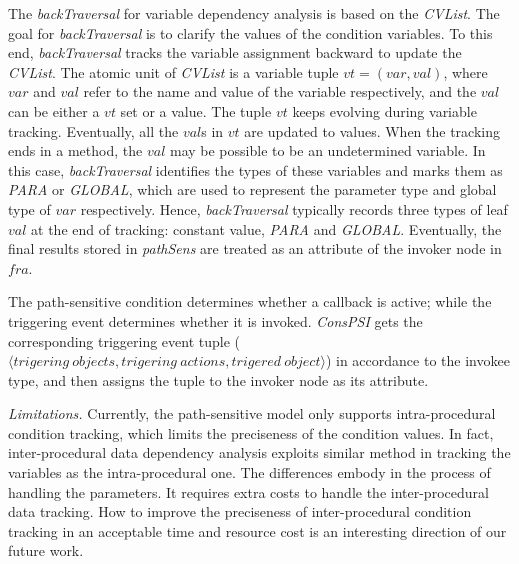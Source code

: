 The \textit{backTraversal} for variable dependency analysis is based on the \textit{CVList}. The goal for \textit{backTraversal} is to clarify the values of the condition variables. To this end, \textit{backTraversal} tracks the variable assignment backward to update the \textit{CVList}. The atomic unit of \textit{CVList} is a variable tuple $\mathit{vt} = (\mathit{var}, \mathit{val})$, where $\mathit{var}$ and $\mathit{val}$ refer to the name and value of the variable respectively, and the $\mathit{val}$ can be either a $\mathit{vt}$ set or a value. The tuple $\mathit{vt}$ keeps evolving during variable tracking. Eventually, all the $\mathit{val}$s in $\mathit{vt}$ are updated to values. %
When the tracking ends in a method, the $\mathit{val}$ may be possible to be an undetermined variable.
In this case, \textit{backTraversal} identifies the types of these variables and marks them as \textit{PARA} or \textit{GLOBAL}, which are  used to represent the parameter type and global type of $\mathit{var}$ respectively. 
Hence, \textit{backTraversal} typically records three types of leaf $\mathit{val}$ at the end of tracking: constant value, \textit{PARA} and \textit{GLOBAL}.  %
Eventually, the final results stored in \textit{pathSens} are treated as an attribute of the invoker node in $\mathit{fra}$.



The path-sensitive condition determines whether a callback is active; while the triggering event determines whether it is invoked.
\textit{ConsPSI} gets the corresponding triggering event tuple ($\langle \mathit{trigering\ objects}, 
\mathit{trigering\ actions}, \mathit{trigered\ object} \rangle$) in accordance to the invokee type, and then assigns the tuple to the invoker node as its attribute. 


\textit{Limitations.}
Currently, the path-sensitive model only supports intra-procedural condition tracking, which limits the preciseness of the condition values. In fact, inter-procedural data dependency analysis exploits similar method in tracking the variables as the intra-procedural one. The differences embody in the process of handling the parameters. It requires extra costs to handle the inter-procedural data tracking. How to improve the preciseness of inter-procedural condition tracking in an acceptable time and resource cost is an interesting direction of our future work.


